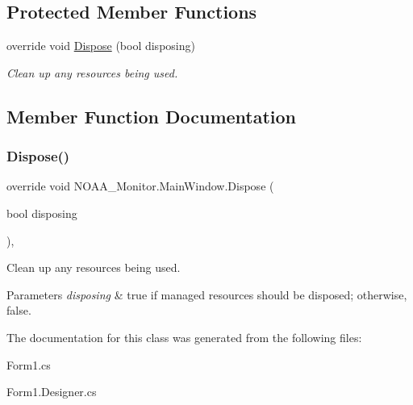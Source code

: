 \subsection*{Protected Member Functions}
\begin{DoxyCompactItemize}
\item 
override void \mbox{\hyperlink{class_n_o_a_a___monitor_1_1_main_window_ac64bbb0b9693f1395e5281805afe01b2}{Dispose}} (bool disposing)
\begin{DoxyCompactList}\small\item\em Clean up any resources being used. \end{DoxyCompactList}\end{DoxyCompactItemize}


\subsection{Member Function Documentation}
\mbox{\label{class_n_o_a_a___monitor_1_1_main_window_ac64bbb0b9693f1395e5281805afe01b2}} 
\subsubsection{\texorpdfstring{Dispose()}{Dispose()}}
{\footnotesize\ttfamily override void N\+O\+A\+A\+\_\+\+Monitor.\+Main\+Window.\+Dispose (\begin{DoxyParamCaption}\item[{bool}]{disposing }\end{DoxyParamCaption})\hspace{0.3cm}{\ttfamily [inline]}, {\ttfamily [protected]}}



Clean up any resources being used. 


\begin{DoxyParams}{Parameters}
{\em disposing} & true if managed resources should be disposed; otherwise, false.\\
\hline
\end{DoxyParams}


The documentation for this class was generated from the following files\+:\begin{DoxyCompactItemize}
\item 
Form1.\+cs\item 
Form1.\+Designer.\+cs\end{DoxyCompactItemize}
